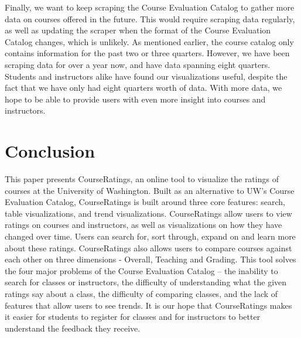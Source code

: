 \documentclass{chi2009}
\begin{document}
Finally, we want to keep scraping the Course Evaluation Catalog to gather more data on courses offered in the future. This would require scraping data regularly, as well as updating the scraper when the format of the Course Evaluation Catalog changes, which is unlikely. As mentioned earlier, the course catalog only contains information for the past two or three quarters. However, we have been scraping data for over a year now, and have data spanning eight quarters. Students and instructors alike have found our visualizations useful, despite the fact that we have only had eight quarters worth of data. With more data, we hope to be able to provide users with even more insight into courses and instructors.

\vspace*{-5 pt}
\section{Conclusion}
This paper presents CourseRatings, an online tool to visualize the ratings of courses at the University of Washington. Built as an alternative to UW’s Course Evaluation Catalog, CourseRatings is built around three core features: search, table visualizations, and trend visualizations. CourseRatings allow users to view ratings on courses and instructors, as well as visualizations on how they have changed over time. Users can search for, sort through, expand on and learn more about these ratings. CourseRatings also allows users to compare courses against each other on three dimensions - Overall, Teaching and Grading. This tool solves the four major problems of the Course Evaluation Catalog -- the inability to search for classes or instructors, the difficulty of understanding what the given ratings say about a class, the difficulty of comparing classes, and the lack of features that allow users to see trends. It is our hope that CourseRatings makes it easier for students to register for classes and for instructors to better understand the feedback they receive.


\vspace*{-5 pt}


\end{document}
